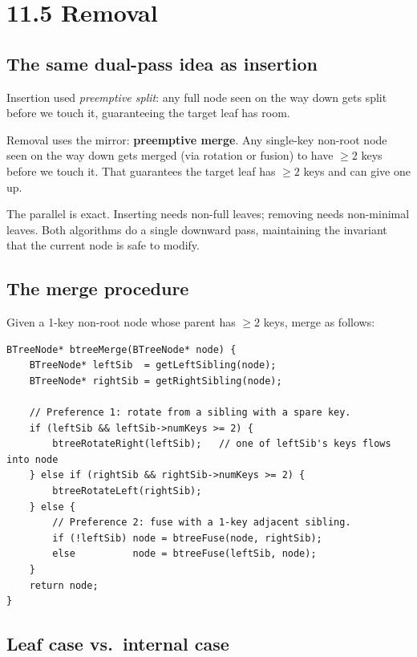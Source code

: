 \documentclass[11pt]{article}
\begin{document}
\section{11.5 Removal}

\subsection*{The same dual-pass idea as insertion}

Insertion used \emph{preemptive split}: any full node seen on the way down gets split before we touch it, guaranteeing the target leaf has room.

Removal uses the mirror: \textbf{preemptive merge}. Any single-key non-root node seen on the way down gets merged (via rotation or fusion) to have $\geq 2$ keys before we touch it. That guarantees the target leaf has $\geq 2$ keys and can give one up.

\begin{ideabox}
The parallel is exact. Inserting needs non-full leaves; removing needs non-minimal leaves. Both algorithms do a single downward pass, maintaining the invariant that the current node is safe to modify.
\end{ideabox}

\subsection*{The merge procedure}

Given a 1-key non-root node whose parent has $\geq 2$ keys, merge as follows:

\begin{lstlisting}[basicstyle=\ttfamily\small,frame=single]
BTreeNode* btreeMerge(BTreeNode* node) {
    BTreeNode* leftSib  = getLeftSibling(node);
    BTreeNode* rightSib = getRightSibling(node);

    // Preference 1: rotate from a sibling with a spare key.
    if (leftSib && leftSib->numKeys >= 2) {
        btreeRotateRight(leftSib);   // one of leftSib's keys flows into node
    } else if (rightSib && rightSib->numKeys >= 2) {
        btreeRotateLeft(rightSib);
    } else {
        // Preference 2: fuse with a 1-key adjacent sibling.
        if (!leftSib) node = btreeFuse(node, rightSib);
        else          node = btreeFuse(leftSib, node);
    }
    return node;
}
\end{lstlisting}

\subsection*{Leaf case vs.\ internal case}
\end{document}
